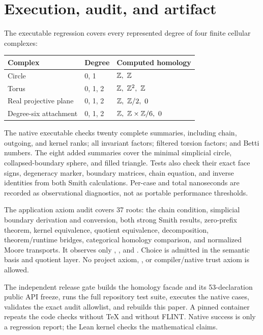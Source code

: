 \section{Execution, audit, and artifact}

The executable regression covers every represented degree of four finite
cellular complexes:

\begin{center}
\begin{tabular}{lll}
\toprule
Complex & Degree & Computed homology\\
\midrule
Circle & 0, 1 & $\Z,\ \Z$\\
Torus & 0, 1, 2 & $\Z,\ \Z^2,\ \Z$\\
Real projective plane & 0, 1, 2 & $\Z,\ \Z/2,\ 0$\\
Degree-six attachment & 0, 1, 2 & $\Z,\ \Z\times\Z/6,\ 0$\\
\bottomrule
\end{tabular}
\end{center}

The native executable checks twenty complete summaries, including chain,
outgoing, and kernel ranks; all invariant factors; filtered torsion factors;
and Betti numbers.  The eight added summaries cover the minimal simplicial
circle, collapsed-boundary sphere, and filled triangle. Tests also check
their exact face signs, degeneracy marker, boundary matrices, chain equation,
and inverse identities from both Smith calculations. Per-case and total
nanoseconds are recorded as observational diagnostics, not as portable
performance thresholds.

The application axiom audit covers 37 roots: the chain condition, simplicial
boundary derivation and conversion, both strong Smith results, zero-prefix
theorem, kernel equivalence, quotient equivalence, decomposition,
theorem/runtime bridges, categorical homology comparison, and normalized
Moore transports.  It observes only
, , and .  Choice is
admitted in the semantic basis and quotient layer.  No project axiom,
, or compiler/native trust axiom is allowed.

The independent release gate builds the homology facade and its 53-declaration
public API freeze, runs the full repository test suite, executes the native cases,
validates the exact audit allowlist, and rebuilds this paper.  A pinned
container repeats the code checks without TeX and without FLINT.  Native
success is only a regression report; the Lean kernel checks the mathematical
claims.
